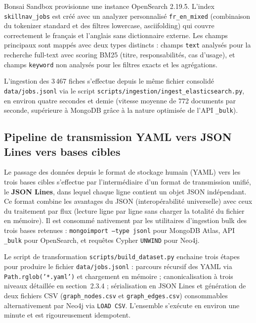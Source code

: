 \documentclass[11pt,a4paper,openany]{report}
\begin{document}
Bonsai Sandbox provisionne une instance OpenSearch 2.19.5. L'index \texttt{skillnav\_jobs} est cr\'e\'e avec un analyzer personnalis\'e \texttt{fr\_en\_mixed} (combinaison du tokenizer standard et des filtres lowercase, asciifolding) qui couvre correctement le fran\c{c}ais et l'anglais sans dictionnaire externe. Les champs principaux sont mapp\'es avec deux types distincts : champs \texttt{text} analys\'es pour la recherche full-text avec scoring BM25 (titre, responsabilit\'es, cas d'usage), et champs \texttt{keyword} non analys\'es pour les filtres exacts et les agr\'egations.

L'ingestion des 3\,467 fiches s'effectue depuis le m\^eme fichier consolid\'e \texttt{data/jobs.jsonl} via le script \texttt{scripts/ingestion/ingest\_elasticsearch.py}, en environ quatre secondes et demie (vitesse moyenne de 772 documents par seconde, sup\'erieure \`a MongoDB gr\^ace \`a la nature optimis\'ee de l'API \texttt{\_bulk}).

\subsection{Pipeline de transmission YAML vers JSON Lines vers bases cibles}

Le passage des donn\'ees depuis le format de stockage humain (YAML) vers les trois bases cibles s'effectue par l'interm\'ediaire d'un format de transmission unifi\'e, le \textbf{JSON Lines}, dans lequel chaque ligne contient un objet JSON ind\'ependant. Ce format combine les avantages du JSON (interop\'erabilit\'e universelle) avec ceux du traitement par flux (lecture ligne par ligne sans charger la totalit\'e du fichier en m\'emoire). Il est consomm\'e nativement par les utilitaires d'ingestion bulk des trois bases retenues : \texttt{mongoimport --type jsonl} pour MongoDB Atlas, API \texttt{\_bulk} pour OpenSearch, et requ\^etes Cypher \texttt{UNWIND} pour Neo4j.

Le script de transformation \texttt{scripts/build\_dataset.py} enchaine trois \'etapes pour produire le fichier \texttt{data/jobs.jsonl} : parcours r\'ecursif des YAML via \texttt{Path.rglob('*.yaml')} et chargement en m\'emoire ; canonicalisation \`a trois niveaux d\'etaill\'ee en section~2.3.4 ; s\'erialisation en JSON Lines et g\'en\'eration de deux fichiers CSV (\texttt{graph\_nodes.csv} et \texttt{graph\_edges.csv}) consommables alternativement par Neo4j via \texttt{LOAD CSV}. L'ensemble s'ex\'ecute en environ une minute et est rigoureusement idempotent.
\end{document}
